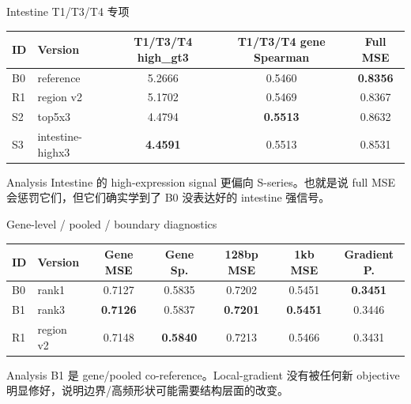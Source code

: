 \documentclass[UTF8,aspectratio=169,10pt]{ctexbeamer}
\begin{document}
\begin{frame}{Intestine T1/T3/T4 专项}
  \centering
  \begin{tabular}{llccc}
    \toprule
    ID & Version & T1/T3/T4 high\_gt3 & T1/T3/T4 gene Spearman & Full MSE \\
    \midrule
    B0 & reference & 5.2666 & 0.5460 & \textbf{0.8356} \\
    R1 & region v2 & 5.1702 & 0.5469 & 0.8367 \\
    S2 & top5x3 & 4.4794 & \textbf{0.5513} & 0.8632 \\
    S3 & intestine-highx3 & \textbf{4.4591} & 0.5513 & 0.8531 \\
    \bottomrule
  \end{tabular}

  \vspace{0.8em}
  \begin{block}{Analysis}
    Intestine 的 high-expression signal 更偏向 S-series。也就是说 full MSE 会惩罚它们，但它们确实学到了 B0 没表达好的 intestine 强信号。
  \end{block}
\end{frame}

\begin{frame}{Gene-level / pooled / boundary diagnostics}
  \centering
  \begin{tabular}{llccccc}
    \toprule
    ID & Version & Gene MSE & Gene Sp. & 128bp MSE & 1kb MSE & Gradient P. \\
    \midrule
    B0 & rank1 & 0.7127 & 0.5835 & 0.7202 & 0.5451 & \textbf{0.3451} \\
    B1 & rank3 & \textbf{0.7126} & 0.5837 & \textbf{0.7201} & \textbf{0.5451} & 0.3446 \\
    R1 & region v2 & 0.7148 & \textbf{0.5840} & 0.7213 & 0.5466 & 0.3431 \\
    \bottomrule
  \end{tabular}

  \vspace{0.8em}
  \begin{block}{Analysis}
    B1 是 gene/pooled co-reference。Local-gradient 没有被任何新 objective 明显修好，说明边界/高频形状可能需要结构层面的改变。
  \end{block}
\end{frame}
\end{document}
